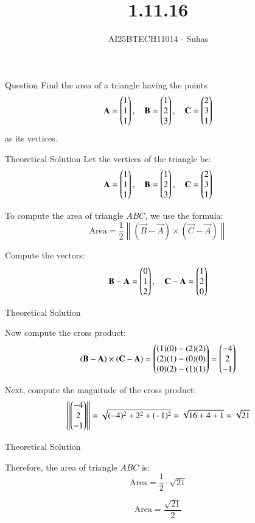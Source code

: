 \documentclass{beamer}
\title{1.11.16}
\author{AI25BTECH11014 - Suhas}
\begin{document}
\frame{\titlepage}

\begin{frame}{Question}
Find the area of a triangle having the points
\[
\mathbf{A} = \begin{pmatrix}1 \\ 1 \\ 1\end{pmatrix}, \quad
\mathbf{B} = \begin{pmatrix}1 \\ 2 \\ 3\end{pmatrix}, \quad
\mathbf{C} = \begin{pmatrix}2 \\ 3 \\ 1\end{pmatrix}
\]
as its vertices.
\end{frame}

\begin{frame}{ Theoretical Solution}
Let the vertices of the triangle be:
\[
\mathbf{A} = \begin{pmatrix}1 \\ 1 \\ 1\end{pmatrix}, \quad
\mathbf{B} = \begin{pmatrix}1 \\ 2 \\ 3\end{pmatrix}, \quad
\mathbf{C} = \begin{pmatrix}2 \\ 3 \\ 1\end{pmatrix}
\]

To compute the area of triangle \(ABC\), we use the formula:
\[
\text{Area} = \frac{1}{2} \left\| (\vec{B} - \vec{A}) \times (\vec{C} - \vec{A}) \right\|
\]

Compute the vectors:
\[
\mathbf{B} - \mathbf{A} = \begin{pmatrix}0 \\ 1 \\ 2\end{pmatrix}, \quad
\mathbf{C} - \mathbf{A} = \begin{pmatrix}1 \\ 2 \\ 0\end{pmatrix}
\]
\end{frame}

\begin{frame}{ Theoretical Solution }

Now compute the cross product:
\[
(\mathbf{B} - \mathbf{A}) \times (\mathbf{C} - \mathbf{A}) =
\begin{pmatrix}
(1)(0) - (2)(2) \\
(2)(1) - (0)(0) \\
(0)(2) - (1)(1)
\end{pmatrix} =
\begin{pmatrix}-4 \\ 2 \\ -1\end{pmatrix}
\]

Next, compute the magnitude of the cross product:
\[
\left\| \begin{pmatrix}-4 \\ 2 \\ -1\end{pmatrix} \right\| =
\sqrt{(-4)^2 + 2^2 + (-1)^2} =
\sqrt{16 + 4 + 1} = \sqrt{21}
\]
\end{frame}


\begin{frame}{ Theoretical Solution }

Therefore, the area of triangle \(ABC\) is:
\[
\text{Area} = \frac{1}{2} \cdot \sqrt{21}
\]

\[
\boxed{\text{Area} = \frac{\sqrt{21}}{2}}
\]

\end{frame}
\end{document}
